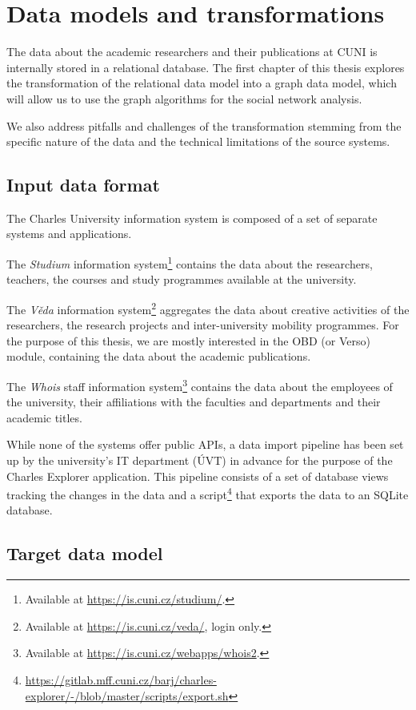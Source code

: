 \chapter{Data models and transformations}

The data about the academic researchers and their publications at CUNI is internally stored in a relational database. 
The first chapter of this thesis explores the transformation of the relational data model into a graph data model, 
which will allow us to use the graph algorithms for the social network analysis.

We also address pitfalls and challenges of the transformation stemming 
from the specific nature of the data and the technical limitations of the source systems.

\section{Input data format}

The Charles University information system is composed of a set of separate systems and applications.

The \textit{Studium} information system\footnote{Available at \url{https://is.cuni.cz/studium/}.} contains the data about the researchers, teachers, the courses and study programmes available at the university.

The \textit{Věda} information system\footnote{Available at \url{https://is.cuni.cz/veda/}, login only.} aggregates the data about creative activities of the researchers, the research projects and inter-university mobility programmes.
For the purpose of this thesis, we are mostly interested in the OBD (or Verso) module, containing the data about the academic publications.

The \textit{Whois} staff information system\footnote{Available at \url{https://is.cuni.cz/webapps/whois2}.} contains the data about the employees of the university, 
their affiliations with the faculties and departments and their academic titles.

While none of the systems offer public APIs, a data import pipeline has been set up by the university's IT department (ÚVT) in advance
for the purpose of the Charles Explorer application. 
This pipeline consists of a set of database views tracking the changes in the data and a script\footnote{\url{https://gitlab.mff.cuni.cz/barj/charles-explorer/-/blob/master/scripts/export.sh}} that exports the data to an SQLite database.


\section{Target data model}\label{sec:target-data-model}

